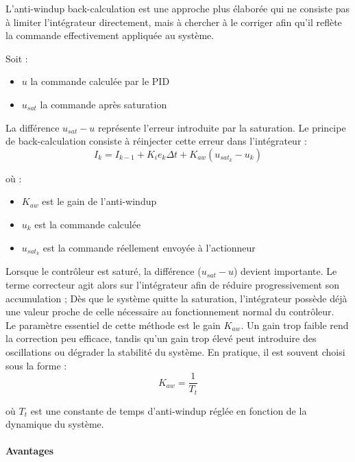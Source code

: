 L'anti-windup back-calculation est une approche plus élaborée qui ne consiste pas à limiter l'intégrateur directement, mais à chercher à le corriger afin qu'il reflète la commande effectivement appliquée au système.

Soit :
\begin{itemize}
    \item $u$ la commande calculée par le PID
    \item $u_{sat}$ la commande après saturation
\end{itemize}

La différence $u_{sat} - u$ représente l'erreur introduite par la saturation. Le principe de back-calculation consiste à réinjecter cette erreur dans l'intégrateur :
\begin{equation}
    I_{k} = I_{k-1} + K_i e_{k} \Delta t + K_{aw} (u_{sat_k} - u_{k})
\end{equation}

où :
\begin{itemize}
    \item $K_{aw}$ est le gain de l'anti-windup
    \item $u_{k}$ est la commande calculée
    \item $u_{sat_k}$ est la commande réellement envoyée à l'actionneur
\end{itemize}

Lorsque le contrôleur est saturé, la différence ($u_{sat}- u$) devient importante. Le terme correcteur agit alors sur l'intégrateur afin de réduire progressivement son accumulation ; Dès que le système quitte la saturation, l'intégrateur possède déjà une valeur proche de celle nécessaire au fonctionnement normal du contrôleur. \\

Le paramètre essentiel de cette méthode est le gain $K_{aw}$. Un gain trop faible rend la correction peu efficace, tandis qu'un gain trop élevé peut introduire des oscillations ou dégrader la stabilité du système. En pratique, il est souvent choisi sous la forme :
\begin{equation}
    K_{aw} = \frac{1}{T_{t}}
\end{equation}

où $T_{t}$ est une constante de temps d'anti-windup réglée en fonction de la dynamique du système. \\

\paragraph{Avantages}

